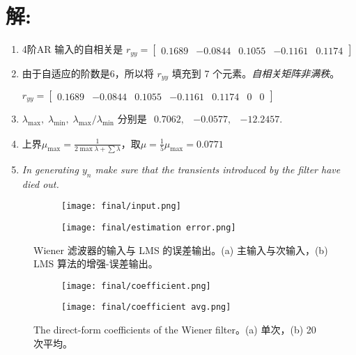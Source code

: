 \documentclass[11pt]{article}
\begin{document}
\section*{解:}\label{solution: b}
\begin{enumerate}
    \item 4阶AR 输入的自相关是 $r_{yy} = \begin{bmatrix} 0.1689 & -0.0844 & 0.1055 & -0.1161 & 0.1174 \end{bmatrix} $
    \item 由于自适应的阶数是6，所以将 $r_{yy}$ 填充到 7 个元素。\emph{自相关矩阵非满秩}。

    $r_{yy} = \begin{bmatrix} 0.1689 & -0.0844 & 0.1055 & -0.1161 & 0.1174 & 0 & 0 \end{bmatrix} $

    \item $λ_{\max},\; λ_{\min},\; λ_{\max}/λ_{\min}$ 分别是 $ \begin{matrix} 0.7062, & -0.0577, & -12.2457.  \end{matrix} $
    \item 上界$\mu_{\max} = \frac{1}{ 2\max{} \lambda + \sum \lambda}$，取$\mu = \frac{1}{5}\mu_{\max} = 0.0771 $

    \item \emph{In generating $y_n$ make sure that the transients introduced by the filter have died out.}
\end{enumerate}

\begin{figure}[!htbp]
    \centering
    \begin{subfigure}[b]{0.49\textwidth}
      \texttt{[image: final/input.png]}
      \caption{}
      \label{fig:inputs}
    \end{subfigure}%
    \hfill  %
    \begin{subfigure}[b]{0.49\textwidth}
      \texttt{[image: final/estimation error.png]}
      \caption{}
      \label{fig:estimation_error}
    \end{subfigure}
    \caption{Wiener 滤波器的输入与 LMS 的误差输出。(a) 主输入与次输入，(b) LMS 算法的增强-误差输出。}
    \label{fig:inputs of Wiener filter}
\end{figure}

\begin{figure}[!htbp]
    \centering
    \begin{subfigure}[b]{0.49\textwidth}
      \texttt{[image: final/coefficient.png]}
      \caption{}
      \label{fig:coefficient}
    \end{subfigure}%
    \hfill  %
    \begin{subfigure}[b]{0.49\textwidth}
      \texttt{[image: final/coefficient avg.png]}
      \caption{}
      \label{fig:coefficient avg}
    \end{subfigure}
    \caption{The direct-form coefficients of the Wiener filter。(a) 单次，(b) 20 次平均。}
    \label{fig:coefficients}
\end{figure}
\end{document}
